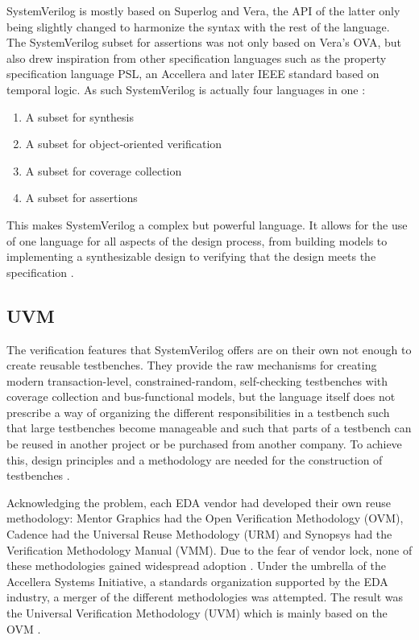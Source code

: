 SystemVerilog is mostly based on Superlog and Vera, the API of the latter only being slightly changed to harmonize the
syntax with the rest of the language. The SystemVerilog subset for assertions was not only based on Vera's OVA, but
also drew inspiration from other specification languages such as the property specification language PSL, an
Accellera and later IEEE standard based on temporal logic. As such SystemVerilog is actually four languages in one
\cite[Ch. 1]{mehta2021introduction}:

\begin{enumerate}
  \item A subset for synthesis
  \item A subset for object-oriented verification
  \item A subset for coverage collection
  \item A subset for assertions
\end{enumerate}

This makes SystemVerilog a complex but powerful language. It allows for the use of one language for all aspects of
the design process, from building models to implementing a synthesizable design to verifying that the design meets
the specification \cite[Ch. 1]{mehta2021introduction}.

\subsection{UVM} %

The verification features that SystemVerilog offers are on their own not enough to create reusable testbenches. They provide
the raw mechanisms for creating modern transaction-level, constrained-random, self-checking testbenches with coverage collection and
bus-functional models, but the language itself does not prescribe a way of organizing the different responsibilities
in a testbench such that large testbenches become manageable and such that parts of a testbench can be reused in
another project or be purchased from another company. To achieve this, design principles and a methodology are needed for
the construction of testbenches \cite[Sec. 9.2]{flake2020a}.

Acknowledging the problem, each EDA vendor had developed their own reuse methodology: Mentor Graphics had the Open
Verification Methodology (OVM), Cadence had the Universal Reuse Methodology (URM) and Synopsys had the Verification
Methodology Manual (VMM). Due to the fear of vendor lock, none of these methodologies gained widespread adoption
\cite[ch. 4.1]{mehta2018asic}. Under the umbrella of the Accellera Systems Initiative, a standards organization
supported by the EDA industry, a merger of the different methodologies was attempted. The result was the Universal
Verification Methodology (UVM) which is mainly based on the OVM \cite[ch. 4.1]{mehta2018asic}.

